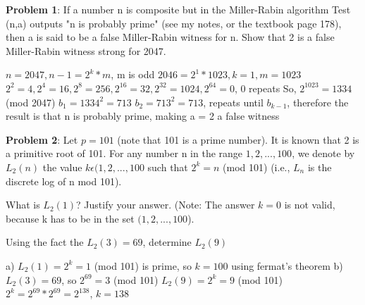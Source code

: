 \documentclass[12pt,letterpaper,final]{report}
\begin{document}

\vline


\noindent\textbf{Problem 1}: If a number n is composite but in the Miller-Rabin algorithm Test (n,a) outputs "n is probably prime" (see my notes, or the textbook page 178), then a is said to be a false Miller-Rabin witness for n. Show that 2 is a false Miller-Rabin witness strong for 2047.

$n = 2047, n - 1 = 2^{k} *  m$, m is odd
\newline $2046 = 2^{1} * 1023, k = 1, m = 1023$
\newline $2^{2} = 4, 2^{4} = 16, 2^{8} = 256, 2^{16} = 32, 2^{32} = 1024, 2^{64} = 0$, 0 repeats
\newline So, $2^{1023} = 1334$ (mod 2047)
\newline $b_1 = 1334^{2} = 713$
\newline $b_2 = 713^{2} = 713$, repeats until $b_{k-1}$, therefore the result is that n is probably prime, making a = 2 a false witness


\bigskip
\noindent\textbf{Problem 2}:  Let $p = 101$ (note that 101 is a prime number). It is known that 2 is a primitive root of 101. For any number n in the range ${1,2, ... , 100}$, we denote by $L_{2}(n)$ the value $k \epsilon {(1,2, ... , 100}$ such that $2^{k} = n$ (mod 101) (i.e., $L_{n}$ is the discrete log of n mod 101).
\begin{alphalist}
	\item\indent What is $L_{2}(1)$? Justify your answer. (Note: The answer $k = 0$ is not valid, because k has to be in the set ${(1,2, ... , 100}$).
	\item\indent Using the fact the $L_{2}(3) = 69$, determine $L_{2}(9)$
\end{alphalist}

a) $L_{2}(1) = 2^{k} = 1$ (mod 101)
 is prime, so $k = 100$ using fermat's theorem
\newline b) $L_{2}(3) = 69$, so $2^{69} = 3$ (mod 101)
\newline $L_{2}(9) = 2^{k} = 9$ (mod 101)
\newline $2^{k} = 2^{69} * 2^{69} = 2^{138}$, $k = 138$
\end{document}
